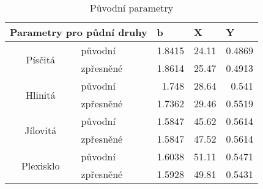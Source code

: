 \begin{table}[htbp]
  \centering
  \caption{Původní parametry}
    \label{tab:puvodni}%
    \begin{tabular}{|clrrr|}
    \hline
	\multicolumn{2}{c}{Parametry pro půdní druhy} & \multicolumn{1}{l}{b} &		\multicolumn{1}{l}{X} & \multicolumn{1}{l}{Y} \\
    \hline    \hline
	\multirow{2}[0]{*}{Písčitá} & původní & 1.8415 & 24.11 & 0.4869 \\
      & zpřesněné & 1.8614 & 25.47 & 0.4913 \\
          \hline
	\multirow{2}[0]{*}{Hlinitá} & původní & 1.748 & 28.64 & 0.541 \\
      & zpřesněné & 1.7362 & 29.46 & 0.5519 \\
          \hline
	\multirow{2}[0]{*}{Jílovitá} & původní & 1.5847 & 45.62 & 0.5614 \\
      & zpřesněné & 1.5847 & 47.52 & 0.5614 \\
          \hline
	\multirow{2}[0]{*}{Plexisklo} & původní & 1.6038 & 51.11 & 0.5471 \\
      & zpřesněné & 1.5928 & 49.81 & 0.5431 \\
          \hline
    \end{tabular}%

\end{table}%
